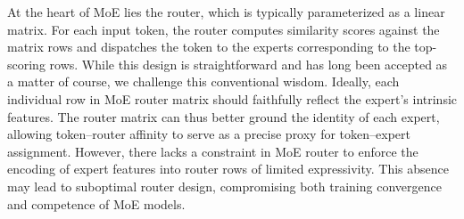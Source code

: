 \documentclass{llmxive}
\begin{document}
At the heart of MoE lies the router, which is typically parameterized as a linear matrix. 
For each input token, the router computes similarity scores against the matrix rows and dispatches the token to the experts corresponding to the top-scoring rows. 
While this design is straightforward and has long been accepted as a matter of course, we challenge this conventional wisdom.
Ideally, each individual row in MoE router matrix should faithfully reflect the expert's intrinsic features.
The router matrix can thus better ground the identity of each expert,
allowing token–router affinity to serve as a precise proxy for token–expert assignment.
However, there lacks a constraint in MoE router to enforce the encoding of expert features into router rows of limited expressivity.
This absence may lead to suboptimal router design, compromising both training convergence and competence of MoE models.



\end{document}
